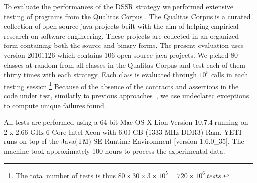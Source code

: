 \documentclass[conference]{IEEEtran}
\begin{document}
To evaluate the performances of the DSSR strategy we performed extensive testing of programs from the Qualitas Corpus \cite{Tempero2010a}. The Qualitas Corpus is a curated collection of open source java projects built with the aim of helping empirical research on  software engineering. These projects are collected in an organized form containing both the source and binary forms. The present evaluation uses version 20101126 which contains 106 open source java projects. We picked 80 classes at random from all classes in the Qualitas Corpus and test each of them thirty times with each strategy.
Each class is evaluated through $10^5$ calls in each testing session.\footnote{The total number of tests is thus $80\times 30\times 3 \times 10^5 = 720\times 10^6~tests$.} 
Because of the absence of the contracts and assertions in the code under test, similarly to previous approaches~\cite{Oriol2012}, we use undeclared exceptions to compute unique failures found.

%
%
%

All tests are performed using a 64-bit Mac OS X Lion Version 10.7.4 running on 2 x 2.66 GHz 6-Core Intel Xeon with 6.00 GB (1333 MHz DDR3) Ram. YETI runs on top of the Java(TM) SE Runtime Environment [version 1.6.0\_35]. The machine took approximately 100 hours to process the experimental data.
\end{document}
